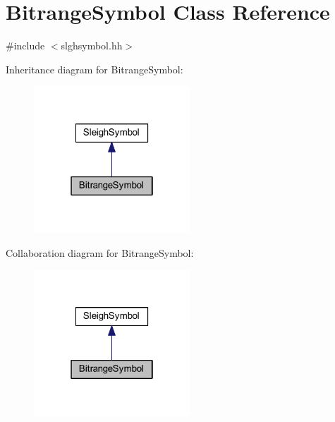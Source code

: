 \hypertarget{class_bitrange_symbol}{}\section{Bitrange\+Symbol Class Reference}
\label{class_bitrange_symbol}


{\ttfamily \#include $<$slghsymbol.\+hh$>$}



Inheritance diagram for Bitrange\+Symbol\+:
\nopagebreak
\begin{figure}[H]
\begin{center}
\leavevmode
\includegraphics[width=166pt]{class_bitrange_symbol__inherit__graph}
\end{center}
\end{figure}


Collaboration diagram for Bitrange\+Symbol\+:
\nopagebreak
\begin{figure}[H]
\begin{center}
\leavevmode
\includegraphics[width=166pt]{class_bitrange_symbol__coll__graph}
\end{center}
\end{figure}

